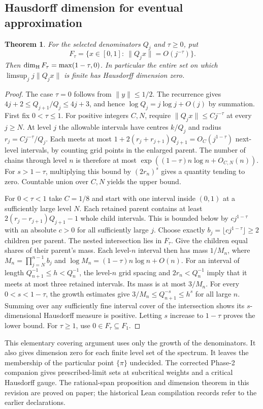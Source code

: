 \documentclass[11pt]{amsart}
\newtheorem{theorem}{Theorem}[section]
\theoremstyle{definition}
\theoremstyle{remark}
\numberwithin{equation}{section}
\begin{document}
\subsection{Hausdorff dimension for eventual approximation}
\label{sec:eventual-dimension}
\begin{theorem}\label{thm:eventual-dimension}
For the selected denominators $Q_j$ and $\tau\ge0$, put
\[
 F_\tau=\{x\in[0,1]:\ \|Q_jx\|=O(j^{-\tau})\}.
\]
Then $\dim_{\rm H}F_\tau=\max(1-\tau,0)$. In particular the
entire set on which $\limsup_j j\|Q_jx\|$ is finite has Hausdorff
dimension zero.
\end{theorem}
\begin{proof}
The case $\tau=0$ follows from $\|y\|\le1/2$. The recurrence gives
$4j+2\le Q_{j+1}/Q_j\le4j+3$, and hence
$\log Q_j=j\log j+O(j)$ by summation. First fix $0<\tau\le1$.
For positive integers $C,N$, require $\|Q_jx\|\le Cj^{-\tau}$
at every $j\ge N$. At level $j$ the allowable intervals have centres
$k/Q_j$ and radius $r_j=Cj^{-\tau}/Q_j$. Each meets at most
$1+2(r_j+r_{j+1})Q_{j+1}=O_C(j^{1-\tau})$ next-level
intervals, by counting grid points in the enlarged parent.
The number of chains through level $n$ is therefore at most
$\exp((1-\tau)n\log n+O_{C,N}(n))$. For $s>1-\tau$,
multiplying this bound by $(2r_n)^s$ gives a quantity tending to
zero. Countable union over $C,N$ yields the upper bound.

For $0<\tau<1$ take $C=1/8$ and start with one interval inside
$(0,1)$ at a sufficiently large level $N$. Each retained parent
contains at least $2(r_j-r_{j+1})Q_{j+1}-1$ whole child intervals.
This is bounded below by $c j^{1-\tau}$ with an absolute $c>0$
for all sufficiently large $j$. Choose exactly
$b_j=\lfloor c j^{1-\tau}\rfloor\ge2$ children per parent.
The nested intersection lies in $F_\tau$. Give the children equal
shares of their parent's mass. Each level-$n$ interval then has mass
$1/M_n$, where $M_n=\prod_{j=N}^{n-1}b_j$ and
$\log M_n=(1-\tau)n\log n+O(n)$.
For an interval of length $Q_{n+1}^{-1}\le h<Q_n^{-1}$, the
level-$n$ grid spacing and $2r_n<Q_n^{-1}$ imply that it meets
at most three retained intervals. Its mass is at most $3/M_n$.
For every $0<s<1-\tau$, the growth estimates give
$3/M_n\le Q_{n+1}^{-s}\le h^s$ for all large $n$.
Summing over any sufficiently fine interval cover of the intersection
shows its $s$-dimensional Hausdorff measure is positive. Letting
$s$ increase to $1-\tau$ proves the lower bound.
For $\tau\ge1$, use $0\in F_\tau\subseteq F_1$.
\end{proof}
This elementary covering argument uses only the growth of the
denominators. It also gives dimension zero for each finite level
set of the spectrum. It leaves the membership of the particular point
$\{\pi\}$ undecided. The corrected Phase-2 companion gives prescribed-limit sets at subcritical weights and a critical Hausdorff gauge. The rational-span proposition and dimension theorem in this
revision are proved on paper; the historical Lean compilation records
refer to the earlier declarations.
\end{document}
